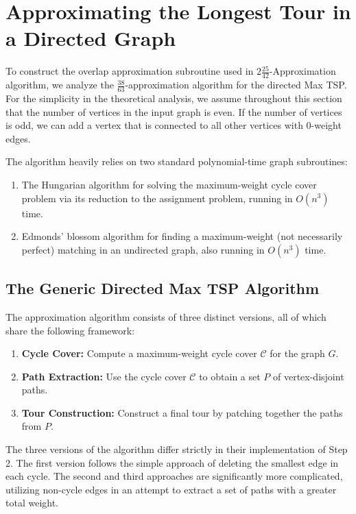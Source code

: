 \section{Approximating the Longest Tour in a Directed Graph}
To construct the overlap approximation subroutine used in
$2\frac{25}{42}$-Approximation algorithm, we analyze the
$\frac{38}{63}$-approximation algorithm for the directed Max TSP. For the
simplicity in the theoretical analysis, we assume throughout this section that
the number of vertices in the input graph is even. If the number of vertices is
odd, we can add a vertex that is connected to all other vertices with $0$-weight
edges.

The algorithm heavily relies on two standard polynomial-time graph subroutines:
\begin{enumerate}
    \item The Hungarian algorithm \cite{kuhn1955hungarian, edmondskarp1972, tomizawa1971techniques} for solving the
    maximum-weight cycle cover problem via its reduction to the assignment
    problem, running in $O(n^3)$ time.
    \item Edmonds' blossom algorithm \cite{edmonds1965paths, edmonds1965matching} for finding a
    maximum-weight (not necessarily perfect) matching in an undirected graph,
    also running in $O(n^3)$ time.
\end{enumerate}

\subsection{The Generic Directed Max TSP Algorithm}
The approximation algorithm consists of three distinct versions, all of which
share the following framework:

\begin{enumerate}
    \item \textbf{Cycle Cover:} Compute a maximum-weight cycle cover
    $\mathcal{C}$ for the graph $G$.
    \item \textbf{Path Extraction:} Use the cycle cover $\mathcal{C}$ to obtain
    a set $P$ of vertex-disjoint paths.
    \item \textbf{Tour Construction:} Construct a final tour by patching
    together the paths from $P$.
\end{enumerate}

The three versions of the algorithm differ strictly in their implementation of
Step 2. The first version follows the simple approach of deleting the smallest
edge in each cycle. The second and third approaches are significantly more
complicated, utilizing non-cycle edges in an attempt to extract a set of paths
with a greater total weight.

